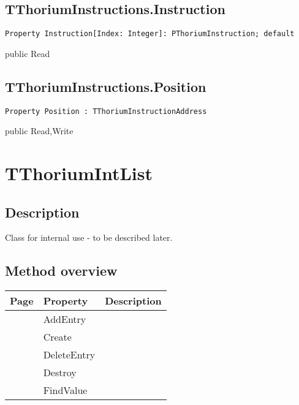 \subsection{TThoriumInstructions.Instruction}
\label{thoriumcorepkg:thorium:tthoriuminstructions:instruction}
\begin{FPCList}
\Declaration 

\begin{verbatim}
Property Instruction[Index: Integer]: PThoriumInstruction; default
\end{verbatim}
\Visibility
public
\Access
Read
\end{FPCList}
\subsection{TThoriumInstructions.Position}
\label{thoriumcorepkg:thorium:tthoriuminstructions:position}
\begin{FPCList}
\Declaration 

\begin{verbatim}
Property Position : TThoriumInstructionAddress
\end{verbatim}
\Visibility
public
\Access
Read,Write
\end{FPCList}
\section{TThoriumIntList}
\label{thoriumcorepkg:thorium:tthoriumintlist}
\subsection{Description}
Class for internal use - to be described later.%
\subsection{Method overview}
\label{thoriumcorepkg:thorium:tthoriumintlist:methods}
\begin{tabularx}{\textwidth}{llX}
Page & Property & Description  \\ \hline
\pageref{thoriumcorepkg:thorium:tthoriumintlist:addentry} & AddEntry  &  \\
\pageref{thoriumcorepkg:thorium:tthoriumintlist:create} & Create  &  \\
\pageref{thoriumcorepkg:thorium:tthoriumintlist:deleteentry} & DeleteEntry  &  \\
\pageref{thoriumcorepkg:thorium:tthoriumintlist:destroy} & Destroy  &  \\
\pageref{thoriumcorepkg:thorium:tthoriumintlist:findvalue} & FindValue  &  \\
\hline
\end{tabularx}
